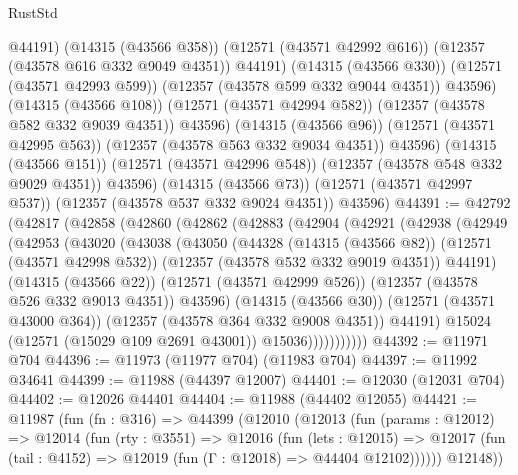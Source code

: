 \begin{lexlean}{RustStd}
\begin{coremodule}
                  @44191)
                (@14315 (@43566 @358))
                (@12571 (@43571 @42992 @616))
                (@12357 (@43578 @616 @332 @9049 @4351))
                @44191)
              (@14315 (@43566 @330))
              (@12571 (@43571 @42993 @599))
              (@12357 (@43578 @599 @332 @9044 @4351))
              @43596)
            (@14315 (@43566 @108))
            (@12571 (@43571 @42994 @582))
            (@12357 (@43578 @582 @332 @9039 @4351))
            @43596)
          (@14315 (@43566 @96))
          (@12571 (@43571 @42995 @563))
          (@12357 (@43578 @563 @332 @9034 @4351))
          @43596)
        (@14315 (@43566 @151))
        (@12571 (@43571 @42996 @548))
        (@12357 (@43578 @548 @332 @9029 @4351))
        @43596)
      (@14315 (@43566 @73))
      (@12571 (@43571 @42997 @537))
      (@12357 (@43578 @537 @332 @9024 @4351))
      @43596)
@44391 := @42792
    (@42817
      (@42858
        (@42860
          (@42862
            (@42883
              (@42904
                (@42921
                  (@42938
                    (@42949
                      (@42953
                        (@43020
                          (@43038
                            (@43050
                              (@44328
                                (@14315 (@43566 @82))
                                (@12571 (@43571 @42998 @532))
                                (@12357 (@43578 @532 @332 @9019 @4351))
                                @44191)
                              (@14315 (@43566 @22))
                              (@12571 (@43571 @42999 @526))
                              (@12357 (@43578 @526 @332 @9013 @4351))
                              @43596)
                            (@14315 (@43566 @30))
                            (@12571 (@43571 @43000 @364))
                            (@12357 (@43578 @364 @332 @9008 @4351))
                            @44191)
                          @15024
                          (@12571 (@15029 @109 @2691 @43001))
                          @15036)))))))))))
@44392 := @11971 @704
@44396 := @11973 (@11977 @704) (@11983 @704)
@44397 := @11992 @34641
@44399 := @11988 (@44397 @12007)
@44401 := @12030 (@12031 @704)
@44402 := @12026 @44401
@44404 := @11988 (@44402 @12055)
@44421 := @11987
    (fun (fn : @316) =>
    @44399
      (@12010
        (@12013
          (fun (params : @12012) =>
          @12014
            (fun (rty : @3551) =>
            @12016
              (fun (lets : @12015) =>
              @12017 (fun (tail : @4152) => @12019 (fun (Γ : @12018) => @44404 @12102))))))
        @12148))

\end{coremodule}
\end{lexlean}

